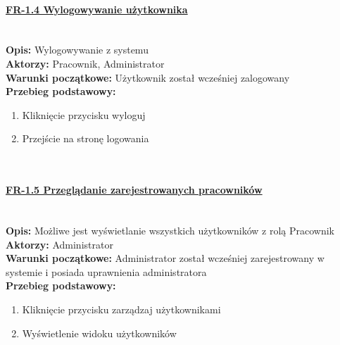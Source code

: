 \paragraph{\underline{FR-1.4 Wylogowywanie użytkownika}}\mbox{}\\[1mm]
	\noindent\textbf{Opis:} Wylogowywanie z systemu\\
	\noindent\textbf{Aktorzy:} Pracownik, Administrator\\
	\textbf{Warunki początkowe:} Użytkownik został wcześniej zalogowany\\
	\textbf{Przebieg podstawowy:}
	\begin{enumerate}[noparskip]
		\item Kliknięcie przycisku wyloguj
		\item Przejście na stronę logowania
	\end{enumerate} \mbox{}\\[-11mm]

\paragraph{\underline{FR-1.5 Przeglądanie zarejestrowanych pracowników}}\mbox{}\\[1mm]
	\noindent\textbf{Opis:} Możliwe jest wyświetlanie wszystkich użytkowników z rolą Pracownik\\
	\noindent\textbf{Aktorzy:} Administrator\\
	\textbf{Warunki początkowe:} Administrator został wcześniej zarejestrowany w systemie i posiada uprawnienia administratora\\
	\textbf{Przebieg podstawowy:}
	\begin{enumerate}[noparskip]
		\item Kliknięcie przycisku zarządzaj użytkownikami
		\item Wyświetlenie widoku użytkowników
	\end{enumerate} \mbox{}\\[-11mm]

